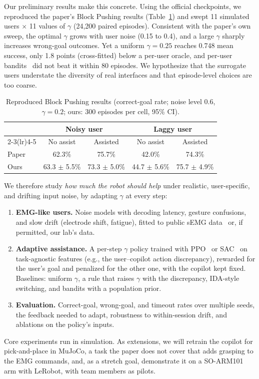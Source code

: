 \documentclass{article}
\begin{document}
Our preliminary results make this concrete. Using the official checkpoints, we reproduced the paper's Block Pushing results (Table~\ref{tab:repro}) and swept 11 simulated users $\times$ 11 values of $\gamma$ (24{,}200 paired episodes). Consistent with the paper's own sweep, the optimal $\gamma$ grows with user noise (0.15 to 0.4), and a large $\gamma$ sharply increases wrong-goal outcomes. Yet a uniform $\gamma=0.25$ reaches 0.748 mean success, only 1.8 points (cross-fitted) below a per-user oracle, and per-user bandits~\citep{auer2002ucb, russo2018ts} did not beat it within 80 episodes. We hypothesize that the surrogate users understate the diversity of real interfaces and that episode-level choices are too coarse.

\begin{table}[h]
  \centering
  \small
  \caption{Reproduced Block Pushing results (correct-goal rate; noise level 0.6, $\gamma=0.2$; ours: 300 episodes per cell, 95\% CI).}
  \label{tab:repro}
  \begin{tabular}{lcccc}
    \toprule
    & \multicolumn{2}{c}{Noisy user} & \multicolumn{2}{c}{Laggy user} \\
    \cmidrule(lr){2-3}\cmidrule(lr){4-5}
    & No assist & Assisted & No assist & Assisted \\
    \midrule
    Paper & 62.3\% & 75.7\% & 42.0\% & 74.3\% \\
    Ours  & 63.3 $\pm$ 5.5\% & 73.3 $\pm$ 5.0\% & 44.7 $\pm$ 5.6\% & 75.7 $\pm$ 4.9\% \\
    \bottomrule
  \end{tabular}
\end{table}

We therefore study \emph{how much the robot should help} under realistic, user-specific, and drifting input noise, by adapting $\gamma$ at every step:
\begin{enumerate}\setlength{\itemsep}{1pt}
  \item \textbf{EMG-like users.} Noise models with decoding latency, gesture confusions, and slow drift (electrode shift, fatigue), fitted to public sEMG data~\citep{atzori2014ninapro, salter2024emg2pose, ctrllabs2025generic} or, if permitted, our lab's data.
  \item \textbf{Adaptive assistance.} A per-step $\gamma$ policy trained with PPO~\citep{schulman2017ppo} or SAC~\citep{haarnoja2018sac} on task-agnostic features (e.g., the user--copilot action discrepancy), rewarded for the user's goal and penalized for the other one, with the copilot kept fixed. Baselines: uniform $\gamma$, a rule that raises $\gamma$ with the discrepancy, IDA-style switching, and bandits with a population prior.
  \item \textbf{Evaluation.} Correct-goal, wrong-goal, and timeout rates over multiple seeds, the feedback needed to adapt, robustness to within-session drift, and ablations on the policy's inputs.
\end{enumerate}
Core experiments run in simulation. As extensions, we will retrain the copilot for pick-and-place in MuJoCo, a task the paper does not cover that adds grasping to the EMG commands, and, as a stretch goal, demonstrate it on a SO-ARM101 arm with LeRobot, with team members as pilots.
\end{document}
